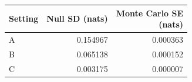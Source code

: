 \begin{tabular}{@{}lrr@{}}
\toprule
Setting & Null SD (nats) & \shortstack{Monte Carlo SE\\(nats)}\\
\midrule
A & 0.154967 & 0.000363\\
B & 0.065138 & 0.000152\\
C & 0.003175 & 0.000007\\
\bottomrule
\end{tabular}
